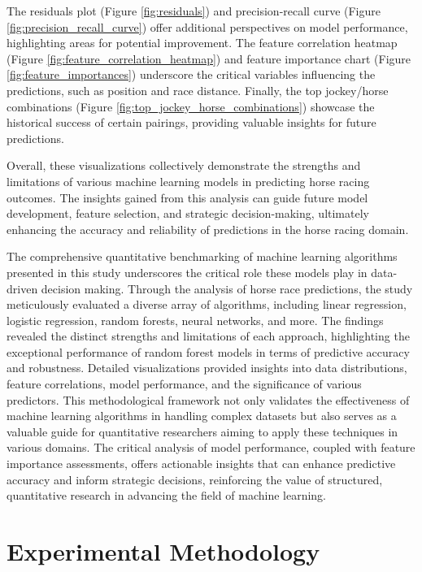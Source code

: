 \documentclass{article}
\begin{document}
The residuals plot (Figure \ref{fig:residuals}) and precision-recall curve (Figure \ref{fig:precision_recall_curve}) offer additional perspectives on model performance, highlighting areas for potential improvement. The feature correlation heatmap (Figure \ref{fig:feature_correlation_heatmap}) and feature importance chart (Figure \ref{fig:feature_importances}) underscore the critical variables influencing the predictions, such as position and race distance. Finally, the top jockey/horse combinations (Figure \ref{fig:top_jockey_horse_combinations}) showcase the historical success of certain pairings, providing valuable insights for future predictions.

Overall, these visualizations collectively demonstrate the strengths and limitations of various machine learning models in predicting horse racing outcomes. The insights gained from this analysis can guide future model development, feature selection, and strategic decision-making, ultimately enhancing the accuracy and reliability of predictions in the horse racing domain.

The comprehensive quantitative benchmarking of machine learning algorithms presented in this study underscores the critical role these models play in data-driven decision making. Through the analysis of horse race predictions, the study meticulously evaluated a diverse array of algorithms, including linear regression, logistic regression, random forests, neural networks, and more. The findings revealed the distinct strengths and limitations of each approach, highlighting the exceptional performance of random forest models in terms of predictive accuracy and robustness. Detailed visualizations provided insights into data distributions, feature correlations, model performance, and the significance of various predictors. This methodological framework not only validates the effectiveness of machine learning algorithms in handling complex datasets but also serves as a valuable guide for quantitative researchers aiming to apply these techniques in various domains. The critical analysis of model performance, coupled with feature importance assessments, offers actionable insights that can enhance predictive accuracy and inform strategic decisions, reinforcing the value of structured, quantitative research in advancing the field of machine learning.

\section*{Experimental Methodology}
\end{document}
